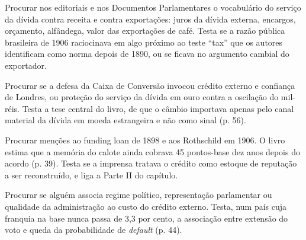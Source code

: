 \begin{dialogo}
\item Procurar nos editoriais e nos Documentos Parlamentares o vocabulário do
serviço da dívida contra receita e contra exportações: juros da dívida externa,
encargos, orçamento, alfândega, valor das exportações de café. Testa se a razão
pública brasileira de 1906 raciocinava em algo próximo ao teste ``tax'' que os
autores identificam como norma depois de 1890, ou se ficava no argumento
cambial do exportador.
\item Procurar se a defesa da Caixa de Conversão invocou crédito externo e
confiança de Londres, ou proteção do serviço da dívida em ouro contra a
oscilação do mil-réis. Testa a tese central do livro, de que o câmbio importava
apenas pelo canal material da dívida em moeda estrangeira e não como sinal
(p. 56).
\item Procurar menções ao funding loan de 1898 e aos Rothschild em 1906. O
livro estima que a memória do calote ainda cobrava 45 pontos-base dez anos
depois do acordo (p. 39). Testa se a imprensa tratava o crédito como estoque de
reputação a ser reconstruído, e liga a Parte II do capítulo.
\item Procurar se alguém associa regime político, representação parlamentar ou
qualidade da administração ao custo do crédito externo. Testa, num país cuja
franquia na base nunca passa de 3,3 por cento, a associação entre extensão do
voto e queda da probabilidade de \emph{default} (p. 44).
\end{dialogo}

